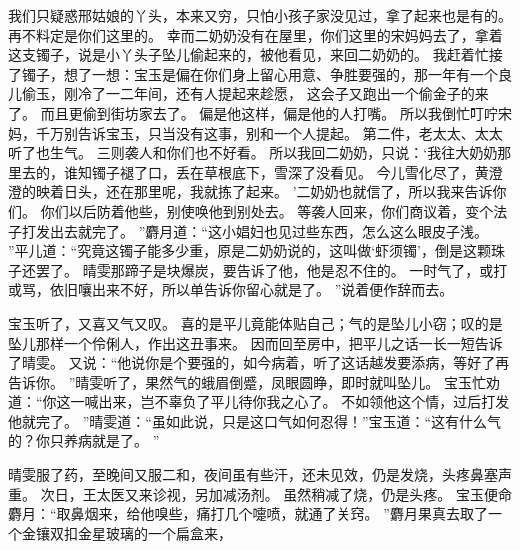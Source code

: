 我们只疑惑邢姑娘的丫头，本来又穷，只怕小孩子家没见过，拿了起来也是有的。
再不料定是你们这里的。
幸而二奶奶没有在屋里，你们这里的宋妈妈去了，拿着这支镯子，说是小丫头子坠儿偷起来的，被他看见，来回二奶奶的。
我赶着忙接了镯子，想了一想：宝玉是偏在你们身上留心用意、争胜要强的，那一年有一个良儿偷玉，刚冷了一二年间，还有人提起来趁愿，
这会子又跑出一个偷金子的来了。
而且更偷到街坊家去了。
偏是他这样，偏是他的人打嘴。
所以我倒忙叮咛宋妈，千万别告诉宝玉，只当没有这事，别和一个人提起。
第二件，老太太、太太听了也生气。
三则袭人和你们也不好看。
所以我回二奶奶，只说：‘我往大奶奶那里去的，谁知镯子褪了口，丢在草根底下，雪深了没看见。
今儿雪化尽了，黄澄澄的映着日头，还在那里呢，我就拣了起来。
’二奶奶也就信了，所以我来告诉你们。
你们以后防着他些，别使唤他到别处去。
等袭人回来，你们商议着，变个法子打发出去就完了。
”麝月道：“这小娼妇也见过些东西，怎么这么眼皮子浅。
”平儿道：“究竟这镯子能多少重，原是二奶奶说的，这叫做‘虾须镯’，倒是这颗珠子还罢了。
晴雯那蹄子是块爆炭，要告诉了他，他是忍不住的。
一时气了，或打或骂，依旧嚷出来不好，所以单告诉你留心就是了。
”说着便作辞而去。
\par
宝玉听了，又喜又气又叹。
喜的是平儿竟能体贴自己；气的是坠儿小窃；叹的是坠儿那样一个伶俐人，作出这丑事来。
因而回至房中，把平儿之话一长一短告诉了晴雯。
又说：“他说你是个要强的，如今病着，听了这话越发要添病，等好了再告诉你。
”晴雯听了，果然气的蛾眉倒蹙，凤眼圆睁，即时就叫坠儿。
宝玉忙劝道：“你这一喊出来，岂不辜负了平儿待你我之心了。
不如领他这个情，过后打发他就完了。
”晴雯道：“虽如此说，只是这口气如何忍得！”宝玉道：“这有什么气的？你只养病就是了。
”\par
晴雯服了药，至晚间又服二和，夜间虽有些汗，还未见效，仍是发烧，头疼鼻塞声重。
次日，王太医又来诊视，另加减汤剂。
虽然稍减了烧，仍是头疼。
宝玉便命麝月：“取鼻烟来，给他嗅些，痛打几个嚏喷，就通了关窍。
”麝月果真去取了一个金镶双扣金星玻璃的一个扁盒来，
